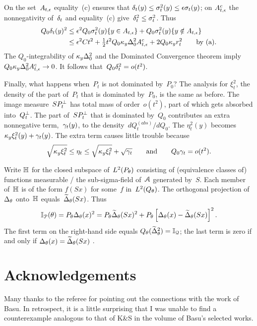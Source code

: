 \documentclass[aos]{imsart}
\def\subheading#1{\medskip\noindent{\normalfont\bfseries #1}}
\theoremstyle{plain}
\theoremstyle{remark}
\begin{document}
On the set~$\Ate$ equality~(c) ensures that $\del_t(y) \le \sig_t^2(y) \le \eps \sig_t(y)$; on $\Ate^c$ the nonnegativity of~$\del_t$ and equality~(c) give~$\del_t^2\le \sig_t^2$.
Thus
\begin{align*}
Q_0 \del_t(y)^2
&\le \eps^2 Q_0 \sig_t^2(y)\{y\in \Ate\} 
+ Q_0 \sig_t^2(y)\{y\notin \Ate\}
\\
&\le \eps^2 Ct^2 + \tfrac12 t^2 Q_0 \kappa_y\Del_0^2\Ate^c + 2Q_0\kappa_y r_t^2
\qt{by (a)}.
\end{align*}
The $Q_0$-integrability of $\kappa_y\Del_0^2$ and the Dominated Convergence theorem imply $Q_0 \kappa_y\Del_0^2\Ate^c\to0$. It follows that~$Q_0\del_t^2=o(t^2)$. 


Finally, what happens when~$P_t$ is not dominated by~$P_0$?
The analysis for $\xi_t^2$, the density of the part of~$P_t$ that is dominated by~$P_0$, is the same as before. The image measure~$S\singP_t$ has total mass of order~$o(t^2)$, part of which gets absorbed into~$\singQ_t$. The part of~$S\singP_t$ that is dominated by~$Q_0$ contributes an extra nonnegative term,~$\gam_t(y)$, to the density~$dQ_t^{(abs)}/dQ_0$.  The $\eta_t^2(y)$ becomes $\kappa_y \xi_t^2(y) +\gam_t(y)$. The extra term causes little  trouble because
$$
\sqrt{\kappa_y\xi_t^2} 
\le \eta_t \le
\sqrt{\kappa_y\xi_t^2} +\sqrt{\gam_t}
\qt{and}\qquad Q_0\gam_t=o(t^2).
$$


\subheading{Proof of assertion~(ii).}
Write $\HH$ for the closed subspace of~$L^2(P_\th)$ consisting of (equivalence classes of) functions measurable \wrt/ the sub-sigma-field of~$\aa$ generated by~$S$. Each member of~$\HH$ is of the form $f(Sx)$ for some~$f$ in~$L^2(Q_\th)$. The orthogonal projection of~$\Del_\th$ onto~$\HH$ equals~$\Deltil_\th(Sx)$. Thus
$$
\II_\pp(\th) = P_\th \Del_\th(x)^2 = 
P_\th \Deltil_\th(Sx)^2 + P_\th\left[\Del_\th(x)-\Deltil_\th(Sx)\right]^2.
$$
The first term on the right-hand side equals $Q_\th(\Deltil_\th^2)= \II_\qq$; the last term is zero if and only if $\Del_\th(x)=\Deltil_\th(Sx)$ .



\section*{Acknowledgements}
Many thanks to the referee for pointing out the connections with the work of Basu.
In retrospect, it is a little surprising that I was unable to find a counterexample analogous to that of K\&S in the volume \citep{DasGupta2011} of Basu's selected works.


%
%
\end{document}
